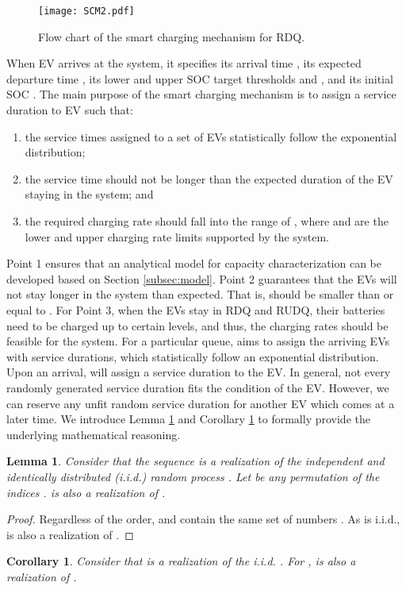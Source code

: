 \documentclass[journal]{IEEEtran}
\newtheorem{lemma}{\textbf{Lemma}}
\newtheorem{corollary}{\textbf{Corollary}}
\begin{document}
\begin{figure}[!t]
\centering
\texttt{[image: SCM2.pdf]} 
\caption{Flow chart of the smart charging mechanism for RDQ.}
\label{fig:scm}
\end{figure}
When EV  arrives at the system, it specifies its arrival time , its expected departure time , its lower and upper SOC target thresholds  and , and its initial SOC .
The main purpose of the smart charging mechanism is to assign a service
duration  to EV  such that:
\begin{enumerate}
\item the service times assigned to a set of EVs statistically follow the exponential distribution;
\item the service time should not be longer than the expected duration of the
EV staying in the system; and
\item the required charging rate should fall into the range of , where  and  are the lower and upper charging rate limits supported by the system.
\end{enumerate}
Point 1 ensures that an analytical model for capacity characterization can be developed based on Section \ref{subsec:model}. Point 2 guarantees that the EVs will not stay longer in the system than expected.  That is,  should be smaller than or equal to . For Point 3, when the EVs stay in RDQ and RUDQ, their batteries need to be charged up to certain levels, and thus, the charging rates should be feasible for the system.
For a particular queue,  aims to assign the arriving EVs with service durations, which statistically follow an exponential distribution. Upon an arrival,  will assign a service duration to the EV. In general, not every randomly generated service duration fits the condition of the EV. However, we can reserve any unfit random service duration for another EV which comes at a later time. We introduce Lemma \ref{lemma:permutation} and Corollary \ref{col:realization} to formally provide the underlying mathematical reasoning.
\begin{lemma} \label{lemma:permutation}
Consider that the sequence  is a realization of the independent and identically distributed (i.i.d.) random process . Let  be any permutation of the indices .  is also a realization of .
\end{lemma}
\begin{proof}
Regardless of the order,  and  contain the same set of numbers . As  is i.i.d.,  is also a realization of .
\end{proof}
\begin{corollary} \label{col:realization}
Consider that  is a realization of the i.i.d. .
For ,  is also a realization of .
\end{corollary}
\end{document}

